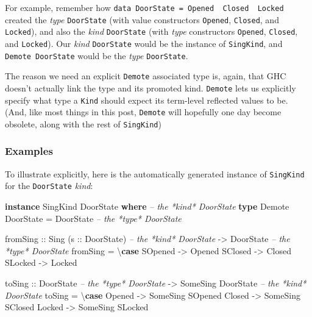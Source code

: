 \documentclass[]{article}
\newenvironment{Shaded}{}{}
\newcommand{\KeywordTok}[1]{\textcolor[rgb]{0.00,0.44,0.13}{\textbf{#1}}}
\newcommand{\DataTypeTok}[1]{\textcolor[rgb]{0.56,0.13,0.00}{#1}}
\newcommand{\CommentTok}[1]{\textcolor[rgb]{0.38,0.63,0.69}{\textit{#1}}}
\newcommand{\OtherTok}[1]{\textcolor[rgb]{0.00,0.44,0.13}{#1}}
\newcommand{\FunctionTok}[1]{\textcolor[rgb]{0.02,0.16,0.49}{#1}}
\newcommand{\NormalTok}[1]{#1}
\begin{document}
For example, remember how
\texttt{data\ DoorState\ =\ Opened\ \textbar{}\ Closed\ \textbar{}\ Locked}
created the \emph{type} \texttt{DoorState} (with value constructors
\texttt{Opened}, \texttt{Closed}, and \texttt{Locked}), and also the \emph{kind}
\texttt{DoorState} (with \emph{type} constructors
\texttt{\textquotesingle{}Opened}, \texttt{\textquotesingle{}Closed}, and
\texttt{\textquotesingle{}Locked}). Our \emph{kind} \texttt{DoorState} would be
the instance of \texttt{SingKind}, and \texttt{Demote\ DoorState} would be the
\emph{type} \texttt{DoorState}.

The reason we need an explicit \texttt{Demote} associated type is, again, that
GHC doesn't actually link the type and its promoted kind. \texttt{Demote} lets
us explicitly specify what type a \texttt{Kind} should expect its term-level
reflected values to be. (And, like most things in this post, \texttt{Demote}
will hopefully one day become obsolete, along with the rest of
\texttt{SingKind})

\subsubsection{Examples}\label{examples}

To illustrate explicitly, here is the automatically generated instance of
\texttt{SingKind} for the \texttt{DoorState} \emph{kind}:

\begin{Shaded}
\begin{Highlighting}[]
\KeywordTok{instance} \DataTypeTok{SingKind} \DataTypeTok{DoorState} \KeywordTok{where}       \CommentTok{-- the *kind* DoorState}
    \KeywordTok{type} \DataTypeTok{Demote} \DataTypeTok{DoorState} \FunctionTok{=} \DataTypeTok{DoorState}   \CommentTok{-- the *type* DoorState}

\NormalTok{    fromSing}
\OtherTok{        ::} \DataTypeTok{Sing}\NormalTok{ (}\OtherTok{s ::} \DataTypeTok{DoorState}\NormalTok{)        }\CommentTok{-- the *kind* DoorState}
        \OtherTok{->} \DataTypeTok{DoorState}                    \CommentTok{-- the *type* DoorState}
\NormalTok{    fromSing }\FunctionTok{=}\NormalTok{ \textbackslash{}}\KeywordTok{case}
        \DataTypeTok{SOpened} \OtherTok{->} \DataTypeTok{Opened}
        \DataTypeTok{SClosed} \OtherTok{->} \DataTypeTok{Closed}
        \DataTypeTok{SLocked} \OtherTok{->} \DataTypeTok{Locked}

\NormalTok{    toSing}
\OtherTok{        ::} \DataTypeTok{DoorState}                    \CommentTok{-- the *type* DoorState}
        \OtherTok{->} \DataTypeTok{SomeSing} \DataTypeTok{DoorState}           \CommentTok{-- the *kind* DoorState}
\NormalTok{    toSing }\FunctionTok{=}\NormalTok{ \textbackslash{}}\KeywordTok{case}
        \DataTypeTok{Opened} \OtherTok{->} \DataTypeTok{SomeSing} \DataTypeTok{SOpened}
        \DataTypeTok{Closed} \OtherTok{->} \DataTypeTok{SomeSing} \DataTypeTok{SClosed}
        \DataTypeTok{Locked} \OtherTok{->} \DataTypeTok{SomeSing} \DataTypeTok{SLocked}
\end{Highlighting}
\end{Shaded}
\end{document}
